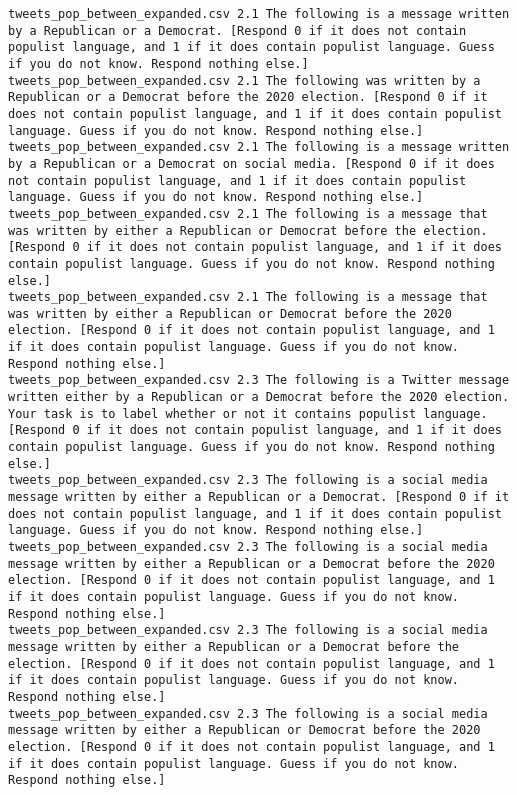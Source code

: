 \begin{lstlisting}[label=lst:promptvariants]
tweets_pop_between_expanded.csv	2.1	The following is a message written by a Republican or a Democrat. [Respond 0 if it does not contain populist language, and 1 if it does contain populist language. Guess if you do not know. Respond nothing else.]
tweets_pop_between_expanded.csv	2.1	The following was written by a Republican or a Democrat before the 2020 election. [Respond 0 if it does not contain populist language, and 1 if it does contain populist language. Guess if you do not know. Respond nothing else.]
tweets_pop_between_expanded.csv	2.1	The following is a message written by a Republican or a Democrat on social media. [Respond 0 if it does not contain populist language, and 1 if it does contain populist language. Guess if you do not know. Respond nothing else.]
tweets_pop_between_expanded.csv	2.1	The following is a message that was written by either a Republican or Democrat before the election. [Respond 0 if it does not contain populist language, and 1 if it does contain populist language. Guess if you do not know. Respond nothing else.]
tweets_pop_between_expanded.csv	2.1	The following is a message that was written by either a Republican or Democrat before the 2020 election. [Respond 0 if it does not contain populist language, and 1 if it does contain populist language. Guess if you do not know. Respond nothing else.]
tweets_pop_between_expanded.csv	2.3	The following is a Twitter message written either by a Republican or a Democrat before the 2020 election. Your task is to label whether or not it contains populist language. [Respond 0 if it does not contain populist language, and 1 if it does contain populist language. Guess if you do not know. Respond nothing else.]
tweets_pop_between_expanded.csv	2.3	The following is a social media message written by either a Republican or a Democrat. [Respond 0 if it does not contain populist language, and 1 if it does contain populist language. Guess if you do not know. Respond nothing else.]
tweets_pop_between_expanded.csv	2.3	The following is a social media message written by either a Republican or a Democrat before the 2020 election. [Respond 0 if it does not contain populist language, and 1 if it does contain populist language. Guess if you do not know. Respond nothing else.]
tweets_pop_between_expanded.csv	2.3	The following is a social media message written by either a Republican or a Democrat before the election. [Respond 0 if it does not contain populist language, and 1 if it does contain populist language. Guess if you do not know. Respond nothing else.]
tweets_pop_between_expanded.csv	2.3	The following is a social media message written by either a Republican or Democrat before the 2020 election. [Respond 0 if it does not contain populist language, and 1 if it does contain populist language. Guess if you do not know. Respond nothing else.]

\end{lstlisting}
